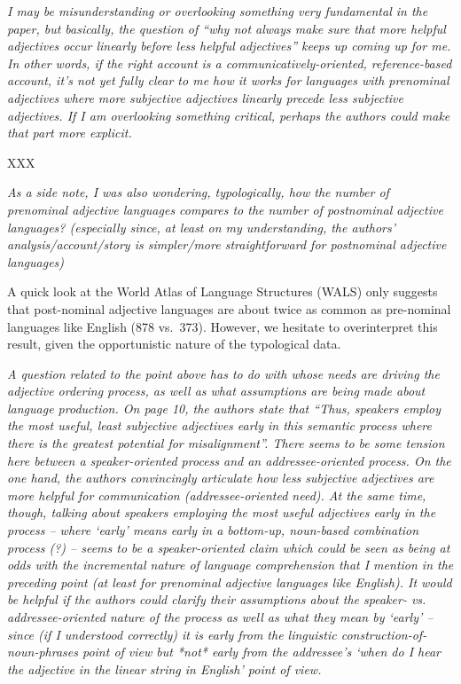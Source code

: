 \documentclass[12pt]{article}
\begin{document}
\emph{I may be misunderstanding or overlooking something very fundamental in the
paper, but basically, the question of ``why not always make sure that more
helpful adjectives occur linearly before less helpful adjectives'' keeps up
coming up for me. In other words, if the right account is a
communicatively-oriented, reference-based account, it's not yet fully
clear to me how it works for languages with prenominal adjectives where more
subjective adjectives linearly precede less subjective adjectives.  If I am
overlooking something critical, perhaps the authors could make that part
more explicit.}

XXX

\item \emph{As a side note, I was also wondering, typologically, how the number of
prenominal adjective languages compares to the number of postnominal
adjective languages?   (especially since, at least on my understanding, the
authors' analysis/account/story is simpler/more straightforward for
postnominal adjective languages)}

A quick look at the World Atlas of Language Structures (WALS) only suggests that post-nominal adjective languages are about twice as common as pre-nominal languages like English (878 vs.~373). However, we hesitate to overinterpret this result, given the opportunistic nature of the typological data.

\item \emph{A question related to the point above has to do with whose needs are driving
the adjective ordering process, as well as what assumptions are being made
about language production. On page 10, the authors state that ``Thus,
speakers employ the most useful, least subjective adjectives early in this
semantic process where there is the greatest potential for misalignment''.
There seems to be some tension here between a speaker-oriented process and
an addressee-oriented process. On the one hand, the authors convincingly
articulate how less subjective adjectives are more helpful for communication
(addressee-oriented need). At the same time, though, talking about speakers
employing the most useful adjectives early in the process – where
`early' means early in a bottom-up, noun-based combination process (?)
– seems to be a speaker-oriented claim which could be seen as being at
odds with the incremental nature of language comprehension that I mention in
the preceding point (at least for prenominal adjective languages like
English).   It would be helpful if the authors could clarify their
assumptions about the speaker- vs. addressee-oriented nature of the process
as well as what they mean by `early'  – since (if I understood
correctly) it is early from the linguistic construction-of-noun-phrases
point of view but *not* early from the addressee's `when do I hear the
adjective in the linear string in English' point of view.}
\end{document}

